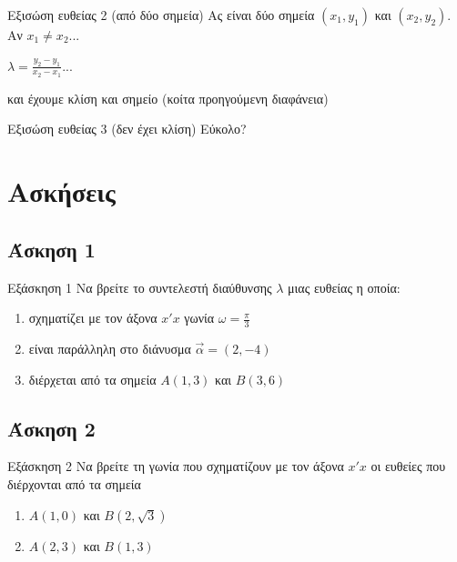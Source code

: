 \documentclass[greek]{beamer}
\begin{document}
\begin{frame}{Εξισώση ευθείας 2 (από δύο σημεία)}
 Ας είναι δύο σημεία $(x_1,y_1)$ και $(x_2,y_2)$. Αν $x_1\ne x_2$... \pause

 $λ=\frac{y_2-y_1}{x_2-x_1}$... \pause

 και έχουμε κλίση και σημείο (κοίτα προηγούμενη διαφάνεια)
\end{frame}

\begin{frame}{Εξισώση ευθείας 3 (δεν έχει κλίση)}
 Εύκολο?
\end{frame}

\section{Ασκήσεις}
\subsection{Άσκηση 1}
\begin{frame}[label=Άσκηση1]{Εξάσκηση 1}
 Να βρείτε το συντελεστή διαύθυνσης $λ$ μιας ευθείας η οποία:
 \begin{enumerate}
  \item<1-> σχηματίζει με τον άξονα $x'x$ γωνία $ω=\frac{π}{3}$
  \item<2-> είναι παράλληλη στο διάνυσμα $\vec{α}=(2,-4)$
  \item<3-> διέρχεται από τα σημεία $Α(1,3)$ και $Β(3,6)$
 \end{enumerate}

\end{frame}

\subsection{Άσκηση 2}
\begin{frame}[label=Άσκηση2]{Εξάσκηση 2}
 Να βρείτε τη γωνία που σχηματίζουν με τον άξονα $x'x$ οι ευθείες που διέρχονται από τα σημεία
 \begin{enumerate}
  \item<1-> $Α(1,0)$ και $Β(2,\sqrt{3})$
  \item<2-> $Α(2,3)$ και $Β(1,3)$
 \end{enumerate}

\end{frame}
\end{document}
